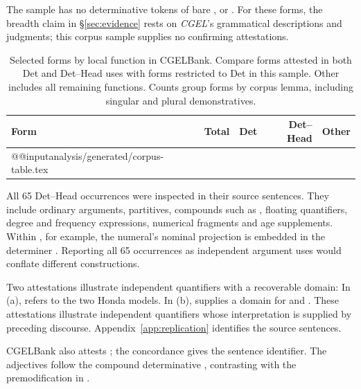 \documentclass[12pt]{article}
\makeatletter
\newcommand{\tablebody}[1]{\csname @@input\endcsname #1 }
\makeatother
\begin{document}
The sample has no determinative tokens of bare ,  or . For these forms, the breadth claim in §\ref{sec:evidence} rests on \textit{CGEL}'s grammatical descriptions and judgments; this corpus sample supplies no confirming attestations.

\begin{table}[tb]
\centering\small
\caption{Selected forms by local function in CGELBank. Compare forms attested in both Det and Det--Head uses with forms restricted to Det in this sample. Other includes all remaining functions. Counts group forms by corpus lemma, including singular and plural demonstratives.}\label{tab:corpus}
\begin{tabular}{lrrrr}
\toprule
Form & Total & Det & Det--Head & Other \\
\midrule
\tablebody{analysis/generated/corpus-table.tex}
\bottomrule
\end{tabular}
\end{table}

All 65 Det--Head occurrences were inspected in their source sentences. They include ordinary arguments, partitives, compounds such as , floating quantifiers, degree and frequency expressions, numerical fragments and age supplements. Within , for example, the numeral's nominal projection is embedded in the determiner . Reporting all 65 occurrences as independent argument uses would conflate different constructions.

Two attestations illustrate independent quantifiers with a recoverable domain:
\ea\label{ex:attested-quantifiers}
\ea {}
\ex {}
\z\z
In (a),  refers to the two Honda models. In (b),  supplies a domain for  and . These attestations illustrate independent quantifiers whose interpretation is supplied by preceding discourse. Appendix~\ref{app:replication} identifies the source sentences.

CGELBank also attests ; the concordance gives the sentence identifier. The adjectives follow the compound determinative , contrasting with the premodification in .
\end{document}

